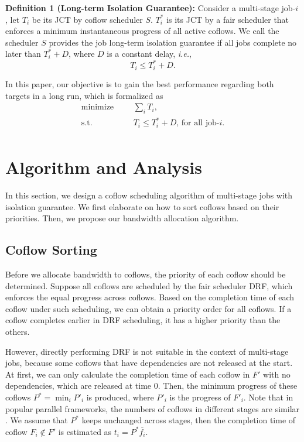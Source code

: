 \documentclass[10pt, conference, letterpaper]{IEEEtran}
\begin{document}
\textbf{Definition 1 (Long-term Isolation Guarantee):} Consider a multi-stage job-$i$, let $T_i$ be its JCT by coflow scheduler $S$. $T_i^*$ is its JCT by a fair scheduler that enforces a minimum instantaneous progress of all active coflows. We call the scheduler $S$ provides the job long-term isolation guarantee if all jobs complete no later than $T_i^* + D$, where $D$ is a constant delay, \emph{i.e.},
\begin{equation}
	T_i \leq T_i^* + D.
\end{equation}

In this paper, our objective is to gain the best performance regarding both targets in a long run, which is formalized as
\begin{equation}
	\begin{aligned}
		\text{minimize} & & &\sum\limits_{i}T_i,\\
		\text{s.t.} & & &T_i \leq T_i^* + D \text{, for all job-}i.\\
	\end{aligned}
\end{equation}

\section{Algorithm and Analysis}\label{algorithm}
In this section, we design a coflow scheduling algorithm of multi-stage jobs with isolation guarantee. We first elaborate on how to sort coflows based on their priorities. Then, we propose our bandwidth allocation algorithm.

\subsection{Coflow Sorting}
Before we allocate bandwidth to coflows, the priority of each coflow should be determined. Suppose all coflows are scheduled by the fair scheduler DRF, which enforces the equal progress across coflows\cite{DRF,HUG}. Based on the completion time of each coflow under such scheduling, we can obtain a priority order for all coflows. If a coflow completes earlier in DRF scheduling, it has a higher priority than the others.

However, directly performing DRF is not suitable in the context of multi-stage jobs, because some coflows that have dependencies are not released at the start. At first, we can only calculate the completion time of each coflow in $F'$ with no dependencies, which are released at time 0. Then, the minimum progress of these coflows $P^* = \min_iP'_i$ is produced, where $P'_i$ is the progress of $F'_i$. Note that in popular parallel frameworks, the numbers of coflows in different stages are similar \cite{Spark,coflowsurvey}. We assume that $P^*$ keeps unchanged across stages, then the completion time of coflow $F_i \notin F'$ is estimated as $t_i = P^*\overline{f_i}$.
\end{document}

